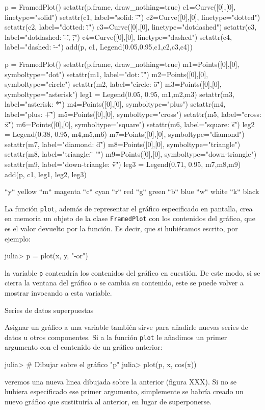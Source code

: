 ﻿\documentclass{article}
\newcommand{\jl}{\texttt}
\begin{document}
p = FramedPlot()
setattr(p.frame, draw_nothing=true)
c1=Curve([0],[0], linetype="solid")
setattr(c1, label="solid: \"-\"")
c2=Curve([0],[0], linetype="dotted")
setattr(c2, label="dotted: \":\"")
c3=Curve([0],[0], linetype="dotdashed")
setattr(c3, label="dotdashed: \"-.\", \";\"")
c4=Curve([0],[0], linetype="dashed")
setattr(c4, label="dashed: \"--\"")
add(p, c1, Legend(0.05,0.95,{c1,c2,c3,c4}))

p = FramedPlot()
setattr(p.frame, draw_nothing=true)
m1=Points([0],[0], symboltype="dot")
setattr(m1, label="dot: \".\"")
m2=Points([0],[0], symboltype="circle")
setattr(m2, label="circle: \"o\"")
m3=Points([0],[0], symboltype="asterisk")
leg1 = Legend(0.05, 0.95, {m1,m2,m3})
setattr(m3, label="asterisk: \"*\"")
m4=Points([0],[0], symboltype="plus")
setattr(m4, label="plus: \"+\"")
m5=Points([0],[0], symboltype="cross")
setattr(m5, label="cross: \"x\"")
m6=Points([0],[0], symboltype="square")
setattr(m6, label="square: \"s\"")
leg2 = Legend(0.38, 0.95, {m4,m5,m6})
m7=Points([0],[0], symboltype="diamond")
setattr(m7, label="diamond: \"d\"")
m8=Points([0],[0], symboltype="triangle")
setattr(m8, label="triangle: \"^^\"")
m9=Points([0],[0], symboltype="down-triangle")
setattr(m9, label="down-triangle: \"v\"")
leg3 = Legend(0.71, 0.95, {m7,m8,m9})
add(p, c1, leg1, leg2, leg3)

``y``     yellow
``m``     magenta
``c``     cyan
``r``     red
``g``     green
``b``     blue
``w``     white
``k``     black

La función \jl{plot}, además de representar el gráfico especificado en pantalla, crea en memoria un objeto de la clase \jl{FramedPlot} con los contenidos del gráfico, que es el valor devuelto por la función. Es decir, que si hubiéramos escrito, por ejemplo:

julia> p = plot(x, y, "-or")

la variable \jl{p} contendría los contenidos del gráfico en cuestión. De este modo, si se cierra la ventana del gráfico o se cambia su contenido, este se puede volver a mostrar invocando a esta variable.


Series de datos superpuestas

Asignar un gráfico a una variable también sirve para añadirle nuevas series de datos u otros componentes. Si a la función \jl{plot} le añadimos un primer argumento con el contenido de un gráfico anterior:

julia> # Dibujar sobre el gráfico "p"
julia> plot(p, x, cos(x))

veremos una nueva linea dibujada sobre la anterior (figura XXX). Si no se hubiera especificado ese primer argumento, simplemente se habría creado un nuevo gráfico que sustituiría al anterior, en lugar de superponerse.
\end{document}
